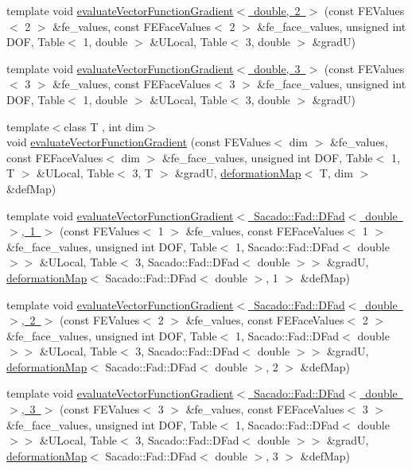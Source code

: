 \begin{DoxyCompactItemize}
\item 
template void \mbox{\hyperlink{function_evaluations_8cc_a729ea5c9032a46494dbeb1c6e1a678c6}{evaluate\+Vector\+Function\+Gradient$<$ double, 2 $>$}} (const F\+E\+Values$<$ 2 $>$ \&fe\+\_\+values, const F\+E\+Face\+Values$<$ 2 $>$ \&fe\+\_\+face\+\_\+values, unsigned int D\+OF, Table$<$ 1, double $>$ \&U\+Local, Table$<$ 3, double $>$ \&gradU)
\item 
template void \mbox{\hyperlink{function_evaluations_8cc_aa2d12bff0463147f781bf71f070705cc}{evaluate\+Vector\+Function\+Gradient$<$ double, 3 $>$}} (const F\+E\+Values$<$ 3 $>$ \&fe\+\_\+values, const F\+E\+Face\+Values$<$ 3 $>$ \&fe\+\_\+face\+\_\+values, unsigned int D\+OF, Table$<$ 1, double $>$ \&U\+Local, Table$<$ 3, double $>$ \&gradU)
\item 
{\footnotesize template$<$class T , int dim$>$ }\\void \mbox{\hyperlink{group___evaluation_functions_ga9608539d601a91aff1ba01ccc720fbe0}{evaluate\+Vector\+Function\+Gradient}} (const F\+E\+Values$<$ dim $>$ \&fe\+\_\+values, const F\+E\+Face\+Values$<$ dim $>$ \&fe\+\_\+face\+\_\+values, unsigned int D\+OF, Table$<$ 1, T $>$ \&U\+Local, Table$<$ 3, T $>$ \&gradU, \mbox{\hyperlink{structdeformation_map}{deformation\+Map}}$<$ T, dim $>$ \&def\+Map)
\item 
template void \mbox{\hyperlink{function_evaluations_8cc_ae5de39f710bc6b9e6009f18de76cadbb}{evaluate\+Vector\+Function\+Gradient$<$ Sacado\+::\+Fad\+::\+D\+Fad$<$ double $>$, 1 $>$}} (const F\+E\+Values$<$ 1 $>$ \&fe\+\_\+values, const F\+E\+Face\+Values$<$ 1 $>$ \&fe\+\_\+face\+\_\+values, unsigned int D\+OF, Table$<$ 1, Sacado\+::\+Fad\+::\+D\+Fad$<$ double $>$$>$ \&U\+Local, Table$<$ 3, Sacado\+::\+Fad\+::\+D\+Fad$<$ double $>$$>$ \&gradU, \mbox{\hyperlink{structdeformation_map}{deformation\+Map}}$<$ Sacado\+::\+Fad\+::\+D\+Fad$<$ double $>$, 1 $>$ \&def\+Map)
\item 
template void \mbox{\hyperlink{function_evaluations_8cc_a27075eb9170789806dc7fb366382e29d}{evaluate\+Vector\+Function\+Gradient$<$ Sacado\+::\+Fad\+::\+D\+Fad$<$ double $>$, 2 $>$}} (const F\+E\+Values$<$ 2 $>$ \&fe\+\_\+values, const F\+E\+Face\+Values$<$ 2 $>$ \&fe\+\_\+face\+\_\+values, unsigned int D\+OF, Table$<$ 1, Sacado\+::\+Fad\+::\+D\+Fad$<$ double $>$$>$ \&U\+Local, Table$<$ 3, Sacado\+::\+Fad\+::\+D\+Fad$<$ double $>$$>$ \&gradU, \mbox{\hyperlink{structdeformation_map}{deformation\+Map}}$<$ Sacado\+::\+Fad\+::\+D\+Fad$<$ double $>$, 2 $>$ \&def\+Map)
\item 
template void \mbox{\hyperlink{function_evaluations_8cc_ab4669516f8f9436b73dedeb24cc0ffff}{evaluate\+Vector\+Function\+Gradient$<$ Sacado\+::\+Fad\+::\+D\+Fad$<$ double $>$, 3 $>$}} (const F\+E\+Values$<$ 3 $>$ \&fe\+\_\+values, const F\+E\+Face\+Values$<$ 3 $>$ \&fe\+\_\+face\+\_\+values, unsigned int D\+OF, Table$<$ 1, Sacado\+::\+Fad\+::\+D\+Fad$<$ double $>$$>$ \&U\+Local, Table$<$ 3, Sacado\+::\+Fad\+::\+D\+Fad$<$ double $>$$>$ \&gradU, \mbox{\hyperlink{structdeformation_map}{deformation\+Map}}$<$ Sacado\+::\+Fad\+::\+D\+Fad$<$ double $>$, 3 $>$ \&def\+Map)

\end{DoxyCompactItemize}
